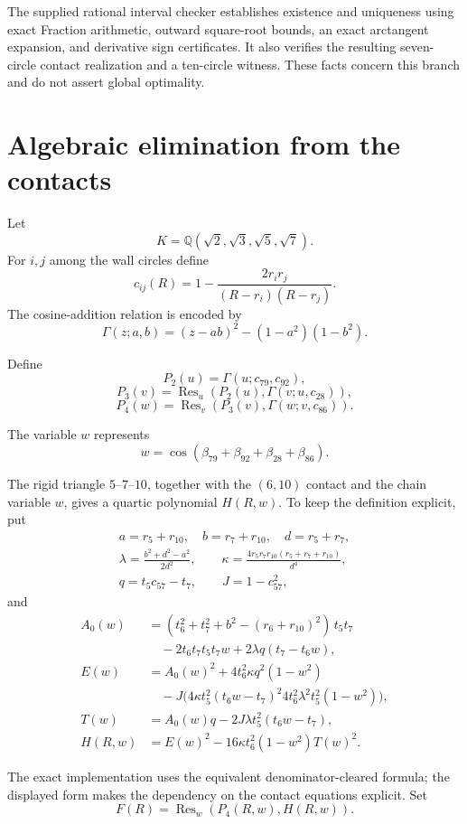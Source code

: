 \documentclass[11pt,a4paper]{article}
\newcommand{\Res}{\operatorname{Res}}
\begin{document}
The supplied rational interval checker establishes existence and uniqueness
using exact Fraction arithmetic, outward square-root bounds, an exact
arctangent expansion, and derivative sign certificates.  It also verifies the
resulting seven-circle contact realization and a ten-circle witness.  These
facts concern this branch and do not assert global optimality.

\section{Algebraic elimination from the contacts}

Let
\[
 K=\mathbb{Q}(\sqrt2,\sqrt3,\sqrt5,\sqrt7).
\]
For $i,j$ among the wall circles define
\[
 c_{ij}(R)=1-\frac{2r_ir_j}{(R-r_i)(R-r_j)}.
\]
The cosine-addition relation is encoded by
\[
 \Gamma(z;a,b)=(z-ab)^2-(1-a^2)(1-b^2).
\]

Define
\[
 P_2(u)=\Gamma(u;c_{79},c_{92}),
\]
\[
 P_3(v)=\Res_u(P_2(u),\Gamma(v;u,c_{28})),
\]
\[
 P_4(w)=\Res_v(P_3(v),\Gamma(w;v,c_{86})).
\]

The variable $w$ represents
\[
 w=\cos(\beta_{79}+\beta_{92}+\beta_{28}+\beta_{86}).
\]

The rigid triangle $5$--$7$--$10$, together with the $(6,10)$ contact and
the chain variable $w$, gives a quartic polynomial $H(R,w)$.  To keep the
definition explicit, put
\[
\begin{gathered}
a=r_5+r_{10},\quad b=r_7+r_{10},\quad d=r_5+r_7,\\
\lambda=\frac{b^2+d^2-a^2}{2d^2},\qquad
\kappa=\frac{4r_5r_7r_{10}(r_5+r_7+r_{10})}{d^4},\\
q=t_5c_{57}-t_7,\qquad J=1-c_{57}^2,
\end{gathered}
\]
and
\[
\begin{aligned}
 A_0(w)&=(t_6^2+t_7^2+b^2-(r_6+r_{10})^2)\,t_5t_7\\
 &\quad-2t_6t_7t_5t_7w+2\lambda q(t_7-t_6w),\\
 E(w)&=A_0(w)^2+4t_6^2\kappa q^2(1-w^2)\\
 &\quad-J\bigl(4\kappa t_5^2(t_6w-t_7)^2
4t_6^2\lambda^2t_5^2(1-w^2)\bigr),\\
 T(w)&=A_0(w)q-2J\lambda t_5^2(t_6w-t_7),\\
 H(R,w)&=E(w)^2-16\kappa t_6^2(1-w^2)T(w)^2.
\end{aligned}
\]

The exact implementation uses the equivalent denominator-cleared formula;
the displayed form makes the dependency on the contact equations explicit.
Set
\[
 F(R)=\Res_w(P_4(R,w),H(R,w)).
\]
\end{document}
